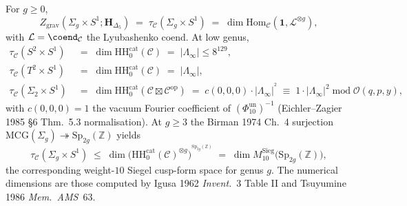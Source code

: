\begin{theorem}
\label{thm:thqghr-rt-genus-g-tower}
For $g\geq 0$,
\[
 Z_{\mathrm{grav}}(\Sigma_g\!\times\! S^1;\mathbf H_{\Delta_5})
 \;=\;
 \tau_{\mathcal C}(\Sigma_g\!\times\! S^1)
 \;=\;
 \dim\mathrm{Hom}_{\mathcal C}(\mathbf 1, \mathcal L^{\otimes g}),
\]
with $\mathcal L = \coend_{\mathcal C}$ the Lyubashenko coend. At low
genus,
\begin{align*}
 \tau_{\mathcal C}(S^2\!\times\! S^1) &\;=\; \dim\mathrm{HH}_0^{\mathrm{cat}}(\mathcal C)
 \;=\; |\Lambda_\infty|\leq 8^{129},\\
 \tau_{\mathcal C}(T^2\!\times\! S^1) &\;=\; \dim\mathrm{HH}_0^{\mathrm{cat}}(\mathcal C)
 \;=\; |\Lambda_\infty|,\\
 \tau_{\mathcal C}(\Sigma_2\!\times\! S^1)
 &\;=\; \dim\mathrm{HH}_0^{\mathrm{cat}}
 (\mathcal C\boxtimes\mathcal C^{\mathrm{op}})
 \;=\; c(0, 0, 0)\cdot|\Lambda_\infty|^{\!{}^{\!2}}
 \;\equiv\; 1\cdot|\Lambda_\infty|^{2}\;\mathrm{mod}\;\mathcal O(q, p, y),
\end{align*}
with $c(0, 0, 0) = 1$ the vacuum Fourier coefficient of
$(\Phi_{10}^{\mathrm{un}})^{-1}$ (Eichler--Zagier 1985 \S 6
Thm.~5.3 normalisation). At
$g\geq 3$ the Birman 1974 Ch.~4 surjection
$\mathrm{MCG}(\Sigma_g)\twoheadrightarrow\mathrm{Sp}_{2g}(\mathbb Z)$
yields
\[
 \tau_{\mathcal C}(\Sigma_g\!\times\! S^1)
 \;\leq\;
 \dim\bigl(\mathrm{HH}_0^{\mathrm{cat}}(\mathcal C)^{\otimes g}\bigr)^{\!{}^{\!\mathrm{Sp}_{2g}(\mathbb Z)}}
 \;=\;
 \dim M^{\mathrm{Sieg}}_{10}\!\bigl(\mathrm{Sp}_{2g}(\mathbb Z)\bigr),
\]
the corresponding weight-$10$ Siegel cusp-form space for genus $g$.
The numerical dimensions are those computed by Igusa 1962
\emph{Invent.}~3 Table II and Tsuyumine 1986 \emph{Mem.~AMS}~63.
\end{theorem}

